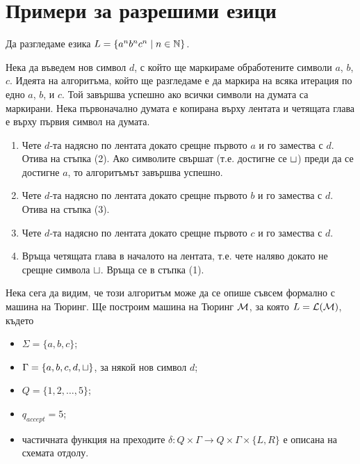 \section{Примери за разрешими езици}

\begin{example}
  Да разгледаме езика $L = \{a^nb^nc^n \mid n\in\mathbb{N}\}$.
 
  Нека да въведем нов символ $d$, с който ще маркираме обработените символи $a$, $b$, $c$.
  Идеята на алгоритъма, който ще разгледаме е да маркира на всяка итерация по едно $a$, $b$, и $c$.
  Той завършва успешно ако всички символи на думата са маркирани.
  Нека първоначално думата е копирана върху лентата и четящата глава е върху първия символ на думата.
  \begin{enumerate}[(1)]
  \item 
    Чете $d$-та надясно по лентата докато срещне първото $a$ и го замества с $d$. Отива на стъпка (2).
    Ако символите свършат (т.е. достигне се $\sqcup$) преди да се достигне $a$,
    то алгоритъмът завършва успешно.
  \item
    Чете $d$-та надясно по лентата докато срещне първото $b$ и го замества с $d$.
    Отива на стъпка (3).
  \item
    Чете $d$-та надясно по лентата докато срещне първото $c$ и го замества с $d$.
  \item
    Връща четящата глава в началото на лентата, т.е. чете наляво докато не срещне символа $\sqcup$.
    Връща се в стъпка (1). 
  \end{enumerate}

  Нека сега да видим, че този алгоритъм може да се опише съвсем формално с машина на Тюринг.
  Ще построим машина на Тюринг $\mathcal{M}$, за която $L = \mathcal{L}(\mathcal{M})$, където
  \begin{itemize}
  \item 
    $\Sigma = \{a,b,c\}$;
  \item
    $\Gamma = \{a,b,c,d,\sqcup\}$, за някой нов символ $d$;
  \item
    $Q = \{1,2,\dots,5\}$;
  \item
    $q_{accept} = 5$;
  \item
    частичната функция на преходите $\delta:Q\times\Gamma \to Q\times\Gamma\times\{L,R\}$
    е описана на схемата отдолу.
  \end{itemize}

  \begin{figure}[H]
    \begin{center}
\end{center}
\end{figure}
\end{example}
